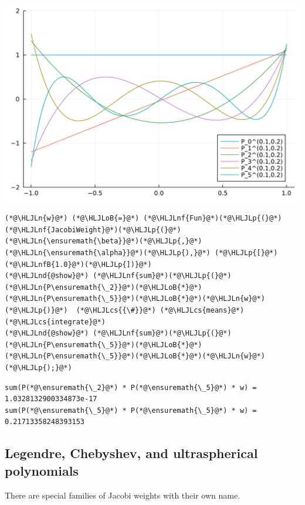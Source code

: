\documentclass[12pt,a4paper]{article}
\newcommand{\HLJLn}[1]{#1}
\newcommand{\HLJLnd}[1]{\textcolor[RGB]{214,102,97}{#1}}
\newcommand{\HLJLnf}[1]{\textcolor[RGB]{66,102,213}{#1}}
\newcommand{\HLJLnfB}[1]{\textcolor[RGB]{59,151,46}{#1}}
\newcommand{\HLJLoB}[1]{\textcolor[RGB]{102,102,102}{\textbf{#1}}}
\newcommand{\HLJLp}[1]{#1}
\newcommand{\HLJLcs}[1]{\textcolor[RGB]{153,153,119}{\textit{#1}}}
\begin{document}
\includegraphics[width=\linewidth]{jl_hpkPoK/OP_methods_test_12_1.pdf}

\begin{lstlisting}
(*@\HLJLn{w}@*) (*@\HLJLoB{=}@*) (*@\HLJLnf{Fun}@*)(*@\HLJLp{(}@*)(*@\HLJLnf{JacobiWeight}@*)(*@\HLJLp{(}@*)(*@\HLJLn{\ensuremath{\beta}}@*)(*@\HLJLp{,}@*)(*@\HLJLn{\ensuremath{\alpha}}@*)(*@\HLJLp{),}@*) (*@\HLJLp{[}@*)(*@\HLJLnfB{1.0}@*)(*@\HLJLp{])}@*)
(*@\HLJLnd{@show}@*) (*@\HLJLnf{sum}@*)(*@\HLJLp{(}@*)(*@\HLJLn{P\ensuremath{\_2}}@*)(*@\HLJLoB{*}@*)(*@\HLJLn{P\ensuremath{\_5}}@*)(*@\HLJLoB{*}@*)(*@\HLJLn{w}@*)(*@\HLJLp{)}@*)  (*@\HLJLcs{{\#}}@*) (*@\HLJLcs{means}@*) (*@\HLJLcs{integrate}@*)
(*@\HLJLnd{@show}@*) (*@\HLJLnf{sum}@*)(*@\HLJLp{(}@*)(*@\HLJLn{P\ensuremath{\_5}}@*)(*@\HLJLoB{*}@*)(*@\HLJLn{P\ensuremath{\_5}}@*)(*@\HLJLoB{*}@*)(*@\HLJLn{w}@*)(*@\HLJLp{);}@*)
\end{lstlisting}

\begin{lstlisting}
sum(P(*@\ensuremath{\_2}@*) * P(*@\ensuremath{\_5}@*) * w) = 1.0328132900334873e-17
sum(P(*@\ensuremath{\_5}@*) * P(*@\ensuremath{\_5}@*) * w) = 0.21713358248393153
\end{lstlisting}


\subsection{Legendre, Chebyshev, and ultraspherical polynomials}
There are special families of Jacobi weights with their own name.
\end{document}
